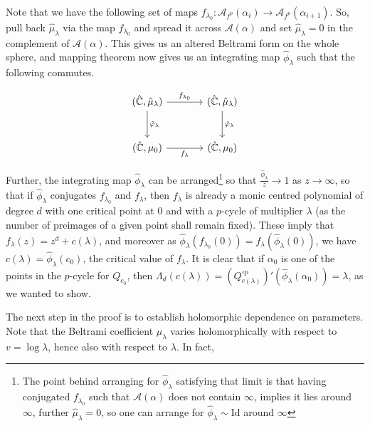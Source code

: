 \documentclass[11pt,a4paper]{article}
\begin{document}
    Note that we have the following set of maps $f_{\lambda_0}: \mathcal{A}_{f^p}(\alpha_i) \rightarrow \mathcal{A}_{f^p}(\alpha_{i+1})$. So, pull back $\hat{\mu}_{\lambda}$ via the map $f_{\lambda_0}$ and spread it across $\mathcal{A}(\alpha)$ and set $\hat{\mu}_{\lambda} = 0$ in the complement of $\mathcal{A}(\alpha)$. This gives us an altered Beltrami form on the whole sphere, and mapping theorem now gives us an integrating map $\hat{\phi}_{\lambda}$ such that the following commutes.

    $$\begin{tikzcd}[column sep = large, row sep = large]
        (\hat{\mathbb{C}}, \hat{\mu}_{\lambda})
        \arrow[d, "\hat{\phi}_{\lambda}"]
        \arrow[r, "f_{\lambda_0}"]
        &
        (\hat{\mathbb{C}}, \hat{\mu}_{\lambda})
        \arrow[d, "\hat{\phi}_{\lambda}"]
        \\
        (\hat{\mathbb{C}}, \mu_0)
        \arrow[r, "f_{\lambda}"']
        &
        (\hat{\mathbb{C}}, \mu_0)
        \end{tikzcd}$$


    Further, the integrating map $\hat{\phi}_{\lambda}$ can be arranged\footnote{The point behind arranging for $\hat{\phi}_{\lambda}$ satisfying that limit is that having conjugated $f_{\lambda_0}$ such that $\mathcal{A}(\alpha)$ does not contain $\infty$, implies it lies around $\infty$, further $\hat{\mu}_{\lambda} = 0$, so one can arrange for $\hat{\phi}_{\lambda} \sim \text{Id}$ around $\infty$} so that $\frac{\hat{\phi}_{\lambda}}{z} \rightarrow 1$ as $z \rightarrow \infty$, so that if $\hat{\phi}_{\lambda}$ conjugates $f_{\lambda_0}$ and $f_{\lambda}$, then $f_{\lambda}$ is already a monic centred polynomial of degree $d$ with one critical point at $0$ and with a $p$-cycle of multiplier $\lambda$ (as the number of preimages of a given point shall remain fixed). These imply that $f_{\lambda}(z) = z^d + c(\lambda)$, and moreover as $\hat{\phi}_{\lambda}(f_{\lambda_0}(0)) = f_{\lambda}(\hat{\phi}_{\lambda}(0))$, we have $c(\lambda) = \hat{\phi}_{\lambda}(c_0)$, the critical value of $f_{\lambda}$. It is clear that if $\alpha_0$ is one of the points in the $p$-cycle for $Q_{c_0}$, then $\Lambda_d(c(\lambda)) = (Q^{\circ p}_{c(\lambda)})'(\hat{\phi}_{\lambda}(\alpha_0)) = \lambda$, as we wanted to show.

    The next step in the proof is to establish holomorphic dependence on parameters. Note that the Beltrami coefficient $\mu_{\lambda}$ varies holomorphically with respect to $v=\log\lambda$, hence also with respect to $\lambda$. In fact,
\end{document}
